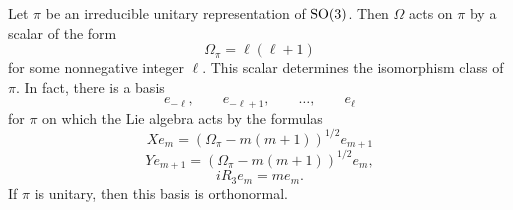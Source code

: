 \documentclass[reqno]{amsart} 
\numberwithin{equation}{section}
\numberwithin{theorem}{section}
\begin{document}
\begin{proposition}\label{proposition:d1a913c915d4}
  Let $\pi$ be an irreducible unitary representation of $\operatorname{SO}(3)$.  Then $\Omega$ acts on $\pi$ by a scalar of the form
  \begin{equation}\label{eqn:d1a9136775d2}
    \Omega_\pi = \ell (\ell + 1)
  \end{equation}
  for some nonnegative integer $\ell$.  This scalar determines the isomorphism class of $\pi$.  In fact, there is a basis
  \begin{equation*}
    e_{- \ell}, \qquad e_{- \ell + 1}, \qquad \dotsc, \qquad e_{\ell }
  \end{equation*}
  for $\pi$ on which the Lie algebra acts by the formulas
  \begin{equation}\label{eqn:d1a913647caa}
    X e_m = \left( \Omega_\pi  - m (m + 1) \right)^{1/2} e_{m + 1}
  \end{equation}
  \begin{equation}\label{eqn:d1a9136592ce}
    Y e_{m+1} = \left( \Omega_\pi - m (m + 1) \right)^{1/2} e_{m},
  \end{equation}
  \begin{equation}\label{eqn:d1a91367ba12}
    i R_3 e_m = m e_m.
  \end{equation}
  If $\pi$ is unitary, then this basis is orthonormal.
\end{proposition}
\end{document}
